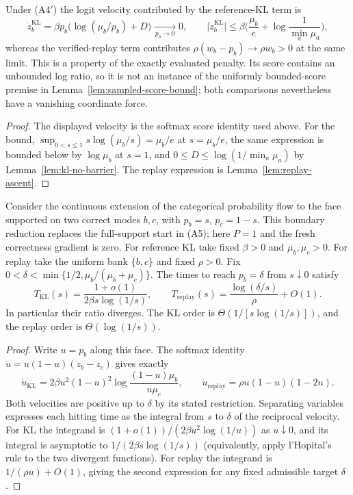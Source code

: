 \begin{lemma}
\enforcehalffinalproseline
\label{lem:kl-boundary-force}
Under (A4$'$) the logit velocity contributed by the reference-KL term is
\[
  \dot z^{\mathrm{KL}}_b=\beta p_b\big(\log(\mu_b/p_b)+D\big)
  \xrightarrow[\,p_b\to0\,]{}0,
  \qquad
  \big|\dot z^{\mathrm{KL}}_b\big|
  \le\beta\Big(\frac{\mu_b}{e}+\log\frac1{\min_a\mu_a}\Big),
\]
whereas the verified-replay term contributes $\rho(w_b-p_b)\to\rho w_b>0$ at
the same limit. This is a property of the exactly evaluated penalty. Its score contains
an unbounded log ratio, so it is not an instance of the uniformly
bounded-score premise in Lemma~\ref{lem:sampled-score-bound}; both
comparisons nevertheless have a vanishing coordinate force.
\end{lemma}

\begin{proof}
\enforcehalffinalproseline
The displayed velocity is the softmax score identity used above. For the
bound, $\sup_{0<s\le1}s\log(\mu_b/s)=\mu_b/e$ at $s=\mu_b/e$, the same
expression is bounded below by $\log\mu_b$ at $s=1$, and $0\le D\le
\log(1/\min_a\mu_a)$ by Lemma~\ref{lem:kl-no-barrier}. The replay expression is
Lemma~\ref{lem:replay-ascent}.
\end{proof}

\begin{corollary}
\enforcehalffinalproseline
\label{cor:kl-recovery-time}
Consider the continuous extension of the categorical probability flow to
the face supported on two correct modes $b,c$, with $p_b=s$, $p_c=1-s$.
This boundary reduction replaces the full-support start in (A5); here $P=1$
and the fresh correctness gradient is zero. For reference KL take fixed
$\beta>0$ and $\mu_b,\mu_c>0$. For replay take the uniform bank $\{b,c\}$
and fixed $\rho>0$. Fix
$0<\delta<\min\{1/2,\mu_b/(\mu_b+\mu_c)\}$.
The times to reach $p_b=\delta$ from $s\downarrow0$ satisfy
\[
 T_{\mathrm{KL}}(s)
 =\frac{1+o(1)}{2\beta s\log(1/s)},\qquad
 T_{\mathrm{replay}}(s)
 =\frac{\log(\delta/s)}{\rho}+O(1).
\]
In particular their ratio diverges. The KL order is
$\Theta(1/[s\log(1/s)])$, and the replay order is
$\Theta(\log(1/s))$.
\end{corollary}
\begin{proof}
\enforcehalffinalproseline
Write $u=p_b$ along this face. The softmax identity
$\dot u=u(1-u)(\dot z_b-\dot z_c)$ gives exactly
\[
 \dot u_{\mathrm{KL}}
 =2\beta u^2(1-u)^2\log\frac{(1-u)\mu_b}{u\mu_c},
 \qquad
 \dot u_{\mathrm{replay}}
 =\rho u(1-u)(1-2u).
\]
Both velocities are positive up to $\delta$ by its stated restriction.
Separating variables expresses each hitting time as the integral from
$s$ to $\delta$ of the reciprocal velocity. For KL the integrand is
$(1+o(1))/(2\beta u^2\log(1/u))$ as $u\downarrow0$, and its integral is
asymptotic to $1/(2\beta s\log(1/s))$ (equivalently, apply
l'Hopital's rule to the two divergent functions). For replay the integrand
is $1/(\rho u)+O(1)$, giving the second expression for any fixed admissible target $\delta$.
\end{proof}

